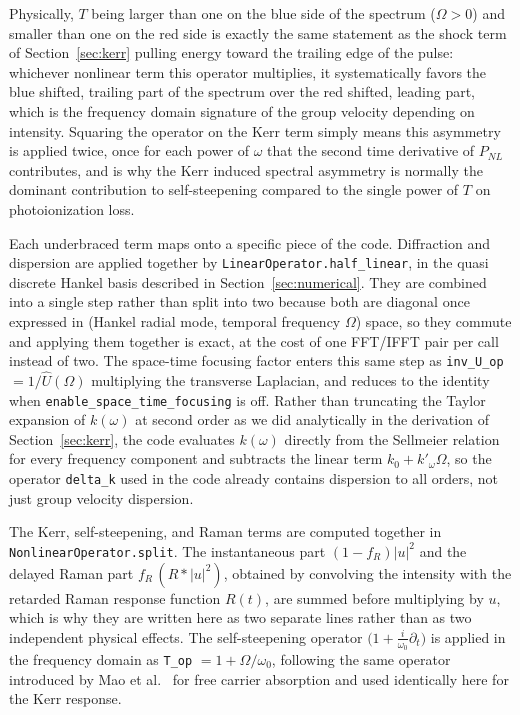 Physically, $T$ being larger than one on the blue side of the spectrum ($\Omega>0$) and smaller than one on the red side is exactly the same statement as the shock term of Section~\ref{sec:kerr} pulling energy toward the trailing edge of the pulse: whichever nonlinear term this operator multiplies, it systematically favors the blue shifted, trailing part of the spectrum over the red shifted, leading part, which is the frequency domain signature of the group velocity depending on intensity. Squaring the operator on the Kerr term simply means this asymmetry is applied twice, once for each power of $\omega$ that the second time derivative of $P_{NL}$ contributes, and is why the Kerr induced spectral asymmetry is normally the dominant contribution to self-steepening compared to the single power of $T$ on photoionization loss.

Each underbraced term maps onto a specific piece of the code. Diffraction and dispersion are applied together by \texttt{LinearOperator.half\_linear}, in the quasi discrete Hankel basis described in Section~\ref{sec:numerical}. They are combined into a single step rather than split into two because both are diagonal once expressed in (Hankel radial mode, temporal frequency $\Omega$) space, so they commute and applying them together is exact, at the cost of one FFT/IFFT pair per call instead of two. The space-time focusing factor enters this same step as \texttt{inv\_U\_op} $=1/\hat{U}(\Omega)$ multiplying the transverse Laplacian, and reduces to the identity when \texttt{enable\_space\_time\_focusing} is off. Rather than truncating the Taylor expansion of $k(\omega)$ at second order as we did analytically in the derivation of Section~\ref{sec:kerr}, the code evaluates $k(\omega)$ directly from the Sellmeier relation for every frequency component and subtracts the linear term $k_0+k'_\omega\Omega$, so the operator \texttt{delta\_k} used in the code already contains dispersion to all orders, not just group velocity dispersion.

The Kerr, self-steepening, and Raman terms are computed together in \texttt{NonlinearOperator.split}. The instantaneous part $(1-f_R)|u|^2$ and the delayed Raman part $f_R\,(R * |u|^2)$, obtained by convolving the intensity with the retarded Raman response function $R(t)$, are summed before multiplying by $u$, which is why they are written here as two separate lines rather than as two independent physical effects. The self-steepening operator $\big(1+\tfrac{i}{\omega_0}\partial_t\big)$ is applied in the frequency domain as \texttt{T\_op} $= 1+\Omega/\omega_0$, following the same operator introduced by Mao et al.~\cite{mao2004} for free carrier absorption and used identically here for the Kerr response.

